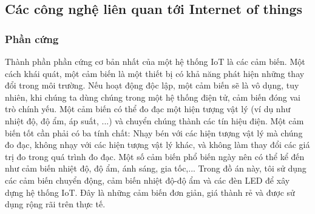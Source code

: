 
\subsection{Các công nghệ liên quan tới Internet of things}
\subsubsection{Phần cứng}
Thành phần phần cứng cơ bản nhất của một hệ thống IoT là các cảm biến. Một cách khái quát, một cảm biến là một thiết bị có khả năng phát hiện những thay đổi trong môi trường. Nếu hoạt động độc lập, một cảm biến sẽ là vô dụng, tuy nhiên, khi chúng ta dùng chúng trong một hệ thống điện tử, cảm biến đóng vai trò chính yếu. Một cảm biến  có thể đo đạc một hiện tượng vật lý (ví dụ như nhiệt độ, độ ẩm, áp suất, ...) và chuyển chúng thành các tín hiệu điện. Một cảm biến tốt cần phải có ba tính chất: Nhạy bén với các hiện tượng vật lý mà chúng đo đạc, không nhạy với các hiện tượng vật lý khác, và không làm thay đổi các giá trị đo trong quá trình đo đạc. Một số cảm biến phổ biến ngày nên có thể kể đến như cảm biến nhiệt độ, độ ẩm, ánh sáng, gia tốc,... Trong đồ án này, tôi sử dụng các cảm biến chuyển động, cảm biến nhiệt độ-độ ẩm và các đèn LED để xây dựng hệ thống IoT. Đây là những cảm biến đơn giản, giá thành rẻ và được sử dụng rộng rãi trên thực tế.\\

